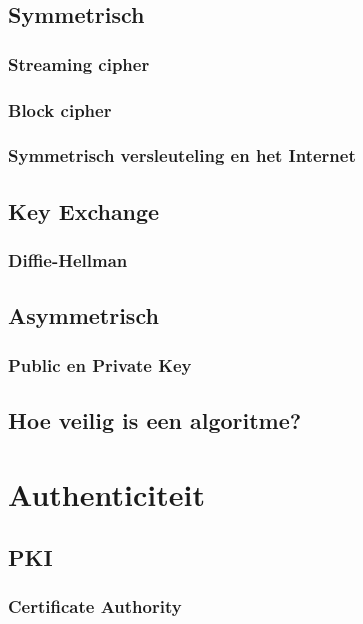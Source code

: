 \documentclass[a4paper,12pt,twoside,openright,titlepage]{book}
\begin{document}
\section{Symmetrisch}

\subsection{Streaming cipher}


\subsection{Block cipher}



\subsection{Symmetrisch versleuteling en het Internet}

\section{Key Exchange}

\subsection{Diffie-Hellman}

\section{Asymmetrisch}

\subsection{Public en Private Key}

\section{Hoe veilig is een algoritme?}



\chapter{Authenticiteit}

\section{PKI}

\subsection{Certificate Authority}


\end{document}
